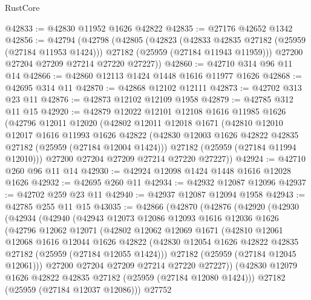 \begin{lexlean}{RustCore}
\begin{coremodule}
@42833 := @42830 @11952 @1626 @42822
@42835 := @27176 @42652 @1342
@42856 := @42794
    (@42798
      (@42805
        (@42823
          (@42833 @42835 @27182 (@25959 (@27184 @11953 @1424)))
          @27182
          (@25959 (@27184 @11943 @11959)))
        @27200
        @27204
        @27209
        @27214
        @27220
        @27227))
@42860 := @42710 @314 @96 @11 @14
@42866 := @42860 @12113 @1424 @1448 @1616 @11977 @1626
@42868 := @42695 @314 @11
@42870 := @42868 @12102 @12111
@42873 := @42702 @313 @23 @11
@42876 := @42873 @12102 @12109 @1958
@42879 := @42785 @312 @11 @15
@42920 := @42879
    @12022
    @12101
    @12108
    @1616
    @11985
    @1626
    (@42796
      @12011
      @12020
      (@42802
        @12011
        @12018
        @1671
        (@42810
          @12010
          @12017
          @1616
          @11993
          @1626
          @42822
          (@42830 @12003 @1626 @42822 @42835 @27182 (@25959 (@27184 @12004 @1424)))
          @27182
          (@25959 (@27184 @11994 @12010)))
        @27200
        @27204
        @27209
        @27214
        @27220
        @27227))
@42924 := @42710 @260 @96 @11 @14
@42930 := @42924 @12098 @1424 @1448 @1616 @12028 @1626
@42932 := @42695 @260 @11
@42934 := @42932 @12087 @12096
@42937 := @42702 @259 @23 @11
@42940 := @42937 @12087 @12094 @1958
@42943 := @42785 @255 @11 @15
@43035 := @42866
    (@42870
      (@42876
        (@42920
          (@42930
            (@42934
              (@42940
                (@42943
                  @12073
                  @12086
                  @12093
                  @1616
                  @12036
                  @1626
                  (@42796
                    @12062
                    @12071
                    (@42802
                      @12062
                      @12069
                      @1671
                      (@42810
                        @12061
                        @12068
                        @1616
                        @12044
                        @1626
                        @42822
                        (@42830 @12054 @1626 @42822 @42835 @27182 (@25959 (@27184 @12055 @1424)))
                        @27182
                        (@25959 (@27184 @12045 @12061)))
                      @27200
                      @27204
                      @27209
                      @27214
                      @27220
                      @27227))
                  (@42830 @12079 @1626 @42822 @42835 @27182 (@25959 (@27184 @12080 @1424)))
                  @27182
                  (@25959 (@27184 @12037 @12086)))
                @27752

\end{coremodule}
\end{lexlean}
